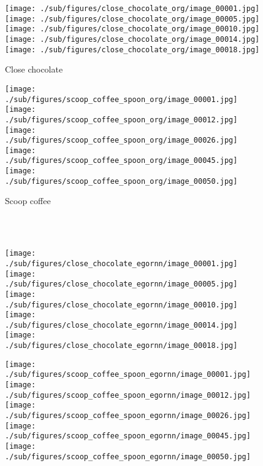 \documentclass[10pt,twocolumn,letterpaper]{article}
\begin{document}
\begin{figure*}[t]
		\centering      
        \begin{subfigure}[b]{0.4\textwidth}
			\caption*{Close chocolate}
\vspace{-0.18cm}
			\texttt{[image: ./sub/figures/close\_chocolate\_org/image\_00001.jpg]}
			\texttt{[image: ./sub/figures/close\_chocolate\_org/image\_00005.jpg]}
			\texttt{[image: ./sub/figures/close\_chocolate\_org/image\_00010.jpg]}
			\texttt{[image: ./sub/figures/close\_chocolate\_org/image\_00014.jpg]}
			\texttt{[image: ./sub/figures/close\_chocolate\_org/image\_00018.jpg]}
			\end{subfigure} \hskip 5mm
	        \begin{subfigure}[b]{0.4\textwidth}
			\caption*{Scoop coffee}
\vspace{-0.18cm}
			\texttt{[image: ./sub/figures/scoop\_coffee\_spoon\_org/image\_00001.jpg]}
			\texttt{[image: ./sub/figures/scoop\_coffee\_spoon\_org/image\_00012.jpg]}
			\texttt{[image: ./sub/figures/scoop\_coffee\_spoon\_org/image\_00026.jpg]}
			\texttt{[image: ./sub/figures/scoop\_coffee\_spoon\_org/image\_00045.jpg]}
			\texttt{[image: ./sub/figures/scoop\_coffee\_spoon\_org/image\_00050.jpg]}
		\end{subfigure}\\
	\ 	
        \begin{subfigure}[b]{0.4\textwidth}
			\texttt{[image: ./sub/figures/close\_chocolate\_egornn/image\_00001.jpg]}
			\texttt{[image: ./sub/figures/close\_chocolate\_egornn/image\_00005.jpg]}
			\texttt{[image: ./sub/figures/close\_chocolate\_egornn/image\_00010.jpg]}
			\texttt{[image: ./sub/figures/close\_chocolate\_egornn/image\_00014.jpg]}
			\texttt{[image: ./sub/figures/close\_chocolate\_egornn/image\_00018.jpg]}
			\end{subfigure} \hskip 5mm
	        \begin{subfigure}[b]{0.4\textwidth}
			\texttt{[image: ./sub/figures/scoop\_coffee\_spoon\_egornn/image\_00001.jpg]}
			\texttt{[image: ./sub/figures/scoop\_coffee\_spoon\_egornn/image\_00012.jpg]}
			\texttt{[image: ./sub/figures/scoop\_coffee\_spoon\_egornn/image\_00026.jpg]}
			\texttt{[image: ./sub/figures/scoop\_coffee\_spoon\_egornn/image\_00045.jpg]}
			\texttt{[image: ./sub/figures/scoop\_coffee\_spoon\_egornn/image\_00050.jpg]}

\end{subfigure}
\end{figure*}
\end{document}
